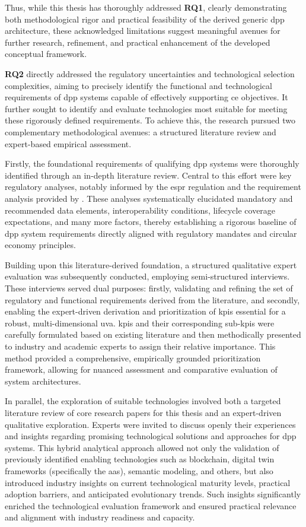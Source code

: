 Thus, while this thesis has thoroughly addressed \textbf{RQ1}, clearly demonstrating both methodological rigor and practical feasibility of the derived generic \ac{dpp} architecture, these acknowledged limitations suggest meaningful avenues for further research, refinement, and practical enhancement of the developed conceptual framework.

\textbf{RQ2} directly addressed the regulatory uncertainties and technological selection complexities, aiming to precisely identify the functional and technological requirements of \ac{dpp} systems capable of effectively supporting \acrlong{ce} objectives. It further sought to identify and evaluate technologies most suitable for meeting these rigorously defined requirements. To achieve this, the research pursued two complementary methodological avenues: a structured literature review and expert-based empirical assessment.

Firstly, the foundational requirements of qualifying \ac{dpp} systems were thoroughly identified through an in-depth literature review. Central to this effort were key regulatory analyses, notably informed by the \ac{espr} regulation and the requirement analysis provided by \textcite{Jansen.2023}. These analyses systematically elucidated mandatory and recommended data elements, interoperability conditions, lifecycle coverage expectations, and many more factors, thereby establishing a rigorous baseline of \ac{dpp} system requirements directly aligned with regulatory mandates and circular economy principles.

Building upon this literature-derived foundation, a structured qualitative expert evaluation was subsequently conducted, employing semi-structured interviews. These interviews served dual purposes: firstly, validating and refining the set of regulatory and functional requirements derived from the literature, and secondly, enabling the expert-driven derivation and prioritization of \ac{kpi}s essential for a robust, multi-dimensional \acrlong{uva}. \ac{kpi}s and their corresponding sub-\ac{kpi}s were carefully formulated based on existing literature and then methodically presented to industry and academic experts to assign their relative importance. This method provided a comprehensive, empirically grounded prioritization framework, allowing for nuanced assessment and comparative evaluation of system architectures.

In parallel, the exploration of suitable technologies involved both a targeted literature review of core research papers for this thesis and an expert-driven qualitative exploration. Experts were invited to discuss openly their experiences and insights regarding promising technological solutions and approaches for \ac{dpp} systems. This hybrid analytical approach allowed not only the validation of previously identified enabling technologies such as blockchain, digital twin frameworks (specifically the \ac{aas}), semantic modeling, and others, but also introduced industry insights on current technological maturity levels, practical adoption barriers, and anticipated evolutionary trends. Such insights significantly enriched the technological evaluation framework and ensured practical relevance and alignment with industry readiness and capacity.

